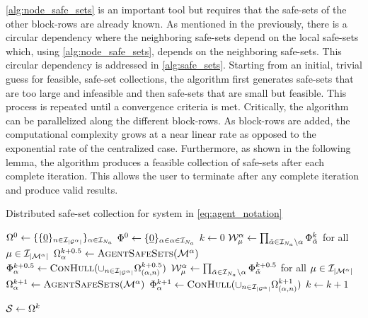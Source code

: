 \autoref{alg:node_safe_sets} is an important tool but requires that the safe-sets of the other block-rows are already known. As mentioned in the previously, there is a circular dependency where the neighboring safe-sets depend on the local safe-sets which, using \autoref{alg:node_safe_sets}, depends on the neighboring safe-sets. This circular dependency is addressed in \autoref{alg:safe_sets}. Starting from an initial, trivial guess for feasible, safe-set collections, the algorithm first generates safe-sets that are too large and infeasible and then safe-sets that are small but feasible. This process is repeated until a convergence criteria is met. Critically, the algorithm can be parallelized along the different block-rows. As block-rows are added, the computational complexity grows at a near linear rate as opposed to the exponential rate of the centralized case. Furthermore, as shown in the following lemma, the algorithm produces a feasible collection of safe-sets after each complete iteration. This allows the user to terminate after any complete iteration and produce valid results. 
\begin{algorithm}[t]
\caption{Distributed safe-set collection for system in \autoref{eq:agent_notation}}\label{alg:safe_sets}
\begin{algorithmic}[1]
\State $\Omega^0\gets\{\{\underline{0}\}_{n\in\idxset{\gnumnodes[\agentidx]}}\}_{\agentidx\in\idxset{\numagents}}$
\State $\Phi^0\gets\{\underline{0}\}_{\alpha\in\alpha\in\mathcal{I}_{{N_a}}}$
\State $k\gets0$
\Repeat
	\ParFor{$\agentidx\in\idxset{\numagents}$}
		\State $\wcon[\modeidx]^\agentidx\gets\prod_{\tilde{\agentidx}\in\idxset{\numagents}\setminus \agentidx}\Phi^{k}_{\tilde\agentidx}$ for all $\modeidx\in\idxset{\nummodes[\agentidx]}$
		\State $\Omega^{k+0.5}_{\agentidx}\gets\Call{AgentSafeSets}{\modes[\agentidx]}$
		\State $\Phi^{k+0.5}_{\agentidx}\gets\Call{ConHull}{\cup_{n\in\idxset{\gnumnodes[{\agentidx}]}}\Omega^{k+0.5}_{({\agentidx},n)}}$
	\EndParFor
	\ParFor{$\agentidx\in\idxset{\numagents}$}
		\State $\wcon[\modeidx]^\agentidx\gets\prod_{\tilde{\agentidx}\in\idxset{\numagents}\setminus \agentidx}\Phi^{k+0.5}_{\tilde\agentidx}$ for all $\modeidx\in\idxset{\nummodes[\agentidx]}$
		\State $\Omega^{k+1}_{\agentidx}\gets\Call{AgentSafeSets}{\modes[\agentidx]}$
		\State $\Phi^{k+1}_{\agentidx}\gets\Call{ConHull}{\cup_{n\in\idxset{\gnumnodes[{\agentidx}]}}\Omega^{k+1}_{({\agentidx},n)}}$
	\EndParFor
	\State $k\gets k+1$

\State $\mathcal{S}\gets\Omega^k$
\EndProcedure
\end{algorithmic}
\end{algorithm}

